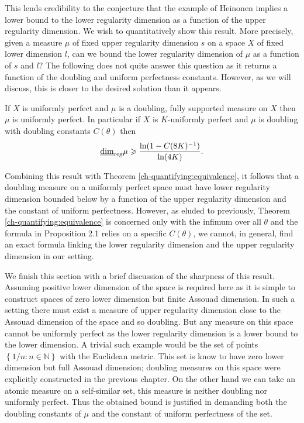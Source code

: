 This lends credibility to the conjecture that the example of Heinonen implies a lower bound to the lower regularity dimension as a function of the upper regularity dimension. We wish to quantitatively show this result. More precisely, given a measure $\mu$ of fixed upper regularity dimension $s$ on a space $X$ of fixed lower dimension $l$, can we bound the lower regularity dimension of $\mu$ as a function of $s$ and $l$? The following does not quite answer this question as it returns a function of the doubling and uniform perfectness constants. However, as we will discuss, this is closer to the desired solution than it appears.

\begin{proposition}\label{ch-quantifying:result-heinonen}
	If $X$ is uniformly perfect and $\mu$ is a doubling, fully supported measure on $X$ then $\mu$ is uniformly perfect. In particular if $X$ is $K$-uniformly perfect and $\mu$ is doubling with doubling constants $C(\theta)$ then  
	$$\underline{\dim}_{\textup{reg}} \mu \geqslant \frac{\ln(1-C(8K)^{-1})}{\ln(4K)} .$$  
\end{proposition}


Combining this result with Theorem \ref{ch-quantifying:equivalence}, it follows that a doubling measure on a uniformly perfect space must have lower regularity dimension bounded below by a function of the upper regularity dimension and the constant of uniform perfectness. However, as eluded to previously, Theorem \ref{ch-quantifying:equivalence} is concerned only with the infimum over all $\theta$ and the formula in Proposition 2.1 relies on a specific $C(\theta)$, we cannot, in general, find an exact formula linking the lower regularity dimension and the upper regularity dimension in our setting.


We finish this section with a brief discussion of the sharpness of this result. Assuming positive lower dimension of the space is required here as it is simple to construct spaces of zero lower dimension but finite Assouad dimension. In such a setting there must exist a measure of upper regularity dimension close to the Assouad dimension of the space and so doubling. But any measure on this space cannot be uniformly perfect as the lower regularity dimension is a lower bound to the lower dimension. A trivial such example would be the set of points $\left\{ 1/n : n \in \mathbb{N} \right\}$ with the Euclidean metric. This set is know to have zero lower dimension but full Assouad dimension; doubling measures on this space were explicitly constructed in the previous chapter. On the other hand we can take an atomic measure on a self-similar set, this measure is neither doubling nor uniformly perfect. Thus the obtained bound is justified in demanding both the doubling constants of $\mu$ and the constant of uniform perfectness of the set.


